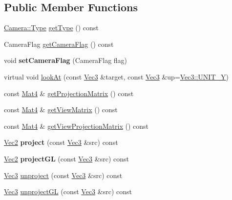 \subsection*{Public Member Functions}
\begin{DoxyCompactItemize}
\item 
\hyperlink{classCamera_a3b0a1f58deca679ac665f61c480d1dcb}{Camera\+::\+Type} \hyperlink{classCamera_ae8f514578aa54023476ad541b167a1e0}{get\+Type} () const
\item 
Camera\+Flag \hyperlink{classCamera_ae7a648c0780484ba413a6197a489f208}{get\+Camera\+Flag} () const
\item 
\mbox{\label{classCamera_a8e214f667fd598da856d0e29eb101c7b}} 
void {\bfseries set\+Camera\+Flag} (Camera\+Flag flag)
\item 
virtual void \hyperlink{classCamera_af5a1abfa877baf99490da53b35293f86}{look\+At} (const \hyperlink{classVec3}{Vec3} \&target, const \hyperlink{classVec3}{Vec3} \&up=\hyperlink{classVec3_a0d569defe7293f1cb108f643230facf5}{Vec3\+::\+U\+N\+I\+T\+\_\+Y})
\item 
const \hyperlink{classMat4}{Mat4} \& \hyperlink{classCamera_a654a29037e5371e0fc5157fe6be89350}{get\+Projection\+Matrix} () const
\item 
const \hyperlink{classMat4}{Mat4} \& \hyperlink{classCamera_ab30a2ac464fe2d653e99502f07325887}{get\+View\+Matrix} () const
\item 
const \hyperlink{classMat4}{Mat4} \& \hyperlink{classCamera_ab7251654fac905a8a8d2b902a81d17e6}{get\+View\+Projection\+Matrix} () const
\item 
\mbox{\label{classCamera_a6288e57471300fa5aed8dd73f8926b66}} 
\hyperlink{classVec2}{Vec2} {\bfseries project} (const \hyperlink{classVec3}{Vec3} \&src) const
\item 
\mbox{\label{classCamera_a4a84dc5bc3e0327d7058c9c369cd3d3a}} 
\hyperlink{classVec2}{Vec2} {\bfseries project\+GL} (const \hyperlink{classVec3}{Vec3} \&src) const
\item 
\hyperlink{classVec3}{Vec3} \hyperlink{classCamera_a06eccde5c9fc644d94e69e505a78d048}{unproject} (const \hyperlink{classVec3}{Vec3} \&src) const
\item 
\hyperlink{classVec3}{Vec3} \hyperlink{classCamera_ac4b6f76b3c9569e12b528e423e45ea41}{unproject\+GL} (const \hyperlink{classVec3}{Vec3} \&src) const
\item 

\end{DoxyCompactItemize}
